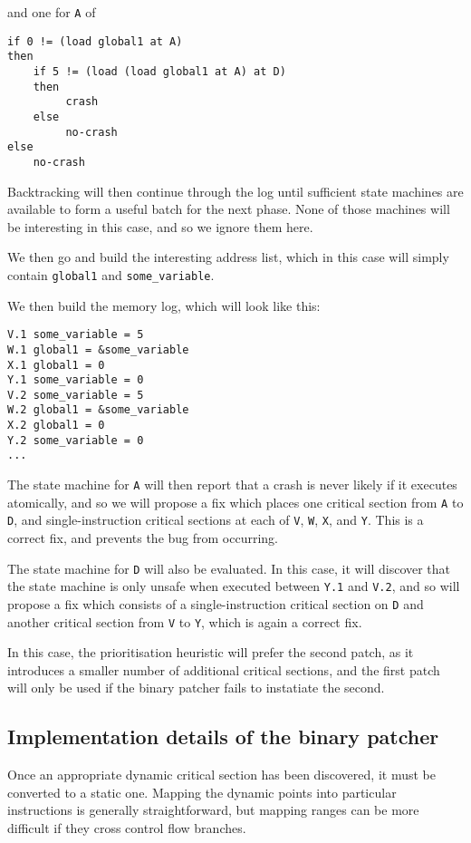 \documentclass[10pt,twocolumn,preprint,natbib,authoryear]{sigplanconf}
\begin{document}
and one for \verb|A| of

\begin{verbatim}
if 0 != (load global1 at A)
then
    if 5 != (load (load global1 at A) at D)
    then
         crash
    else
         no-crash
else
    no-crash
\end{verbatim}

Backtracking will then continue through the log until sufficient state
machines are available to form a useful batch for the next phase.
None of those machines will be interesting in this case, and so we
ignore them here.

We then go and build the interesting address list, which in this case
will simply contain \verb|global1| and \verb|some_variable|.

We then build the memory log, which will look like this:

\begin{verbatim}
V.1 some_variable = 5
W.1 global1 = &some_variable
X.1 global1 = 0
Y.1 some_variable = 0
V.2 some_variable = 5
W.2 global1 = &some_variable
X.2 global1 = 0
Y.2 some_variable = 0
...
\end{verbatim}

The state machine for \verb|A| will then report that a crash is never
likely if it executes atomically, and so we will propose a fix which
places one critical section from \verb|A| to \verb|D|, and
single-instruction critical sections at each of \verb|V|, \verb|W|,
\verb|X|, and \verb|Y|.  This is a correct fix, and prevents the bug
from occurring.

The state machine for \verb|D| will also be evaluated.  In this case,
it will discover that the state machine is only unsafe when executed
between \verb|Y.1| and \verb|V.2|, and so will propose a fix which
consists of a single-instruction critical section on \verb|D| and
another critical section from \verb|V| to \verb|Y|, which is again a
correct fix.

In this case, the prioritisation heuristic will prefer the second
patch, as it introduces a smaller number of additional critical
sections, and the first patch will only be used if the binary patcher
fails to instatiate the second.


\subsection{Implementation details of the binary patcher}

Once an appropriate dynamic critical section has been discovered, it
must be converted to a static one.  Mapping the dynamic points into
particular instructions is generally straightforward, but mapping
ranges can be more difficult if they cross control flow branches.
\end{document}
